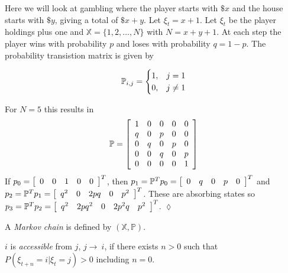 \begin{example}
Here we will look at gambling where the player starts with $\$x$ and the house starts with $\$y$, giving a total of $\$x+y$.
Let $\xi_t=x+1$.
Let $\xi_t$ be the player holdings plus one and $\mathbb{X}=\{1,2,\ldots,N\}$ with $N=x+y+1$.
At each step the player wins with probability $p$ and loses with probability $q=1-p$.
The probability transistion matrix is given by

\begin{equation*}
\mathbb{P}_{i,j} = \begin{cases} 1, & j=1 \\ 0, & j\neq1 \end{cases}
\end{equation*}

For $N=5$ this results in
\begin{align*}
\mathbb{P} = \left[\begin{array}{c c c c c}
1 & 0 & 0 & 0 & 0 \\
q & 0 & p & 0 & 0 \\
0 & q & 0 & p & 0 \\
0 & 0 & q & 0 & p \\
0 & 0 & 0 & 0 & 1
\end{array}\right]
\end{align*}
If $p_0 = \left[\begin{array}{c c c c c} 0 & 0 & 1 & 0 & 0 \end{array}\right]^T$, then $p_1=\mathbb{P}^Tp_0 = \left[\begin{array}{c c c c c} 0 & q & 0 & p & 0 \end{array}\right]^T$ and $p_2=\mathbb{P}^Tp_1=\left[\begin{array}{c c c c c} q^2 & 0 & 2pq & 0 & p^2 \end{array}\right]^T$.
These are absorbing states so $p_3=\mathbb{P}^Tp_2=\left[\begin{array}{c c c c c} q^2 & 2pq^2 & 0 & 2p^2q & p^2 \end{array}\right]^T$.
$\lozenge$
\end{example}

\begin{definition}
A \textit{Markov chain} is defined by $ (\mathbb{X},\mathbb{P})$.
\end{definition}

\begin{definition}
$i$ is \textit{accessible} from $j$, $j\rightarrow~i$, if there exists $n>0$ such that $P (\xi_{t+n}=i|\xi_t=j)>0$ including $n=0$.
\end{definition}

